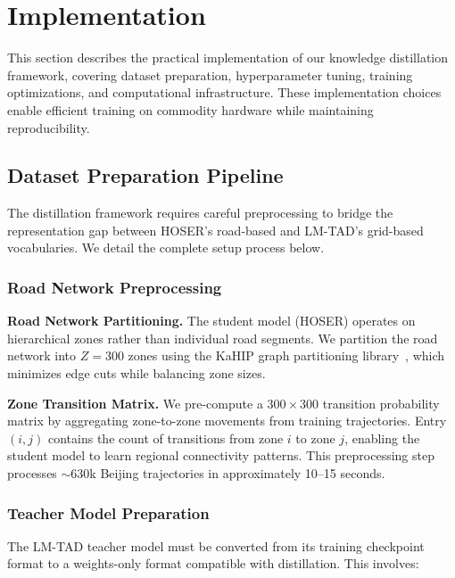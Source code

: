 
\section{Implementation}
\label{sec:implementation}

This section describes the practical implementation of our knowledge distillation framework, covering dataset preparation, hyperparameter tuning, training optimizations, and computational infrastructure. These implementation choices enable efficient training on commodity hardware while maintaining reproducibility.

\subsection{Dataset Preparation Pipeline}
\label{sec:impl-dataset-prep}

The distillation framework requires careful preprocessing to bridge the representation gap between HOSER's road-based and LM-TAD's grid-based vocabularies. We detail the complete setup process below.

\subsubsection{Road Network Preprocessing}

\textbf{Road Network Partitioning.} The student model (HOSER) operates on hierarchical zones rather than individual road segments. We partition the road network into $Z = 300$ zones using the KaHIP graph partitioning library~\cite{sandersEngineeringMultilevelGraph2011}, which minimizes edge cuts while balancing zone sizes.

\textbf{Zone Transition Matrix.} We pre-compute a $300 \times 300$ transition probability matrix by aggregating zone-to-zone movements from training trajectories. Entry $(i,j)$ contains the count of transitions from zone $i$ to zone $j$, enabling the student model to learn regional connectivity patterns. This preprocessing step processes $\sim$630k Beijing trajectories in approximately 10--15 seconds.

\subsubsection{Teacher Model Preparation}

The LM-TAD teacher model must be converted from its training checkpoint format to a weights-only format compatible with distillation. This involves:

